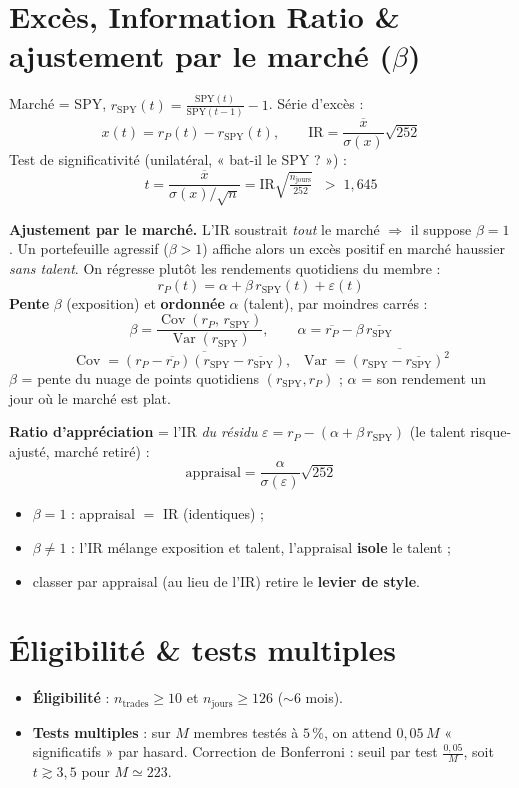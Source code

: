 \documentclass[10pt,a4paper,twocolumn]{article}
\begin{document}
\section{Excès, Information Ratio \& ajustement par le marché (\texorpdfstring{$\beta$}{beta})}\label{sec:beta}
Marché = SPY, $r_{\text{SPY}}(t)=\tfrac{\text{SPY}(t)}{\text{SPY}(t-1)}-1$. Série d'excès :
$$x(t)=r_P(t)-r_{\text{SPY}}(t),\qquad
  \mathrm{IR}=\frac{\overline{x}}{\sigma(x)}\sqrt{252}$$
Test de significativité (unilatéral, « bat-il le SPY ? ») :
$$t=\frac{\overline{x}}{\sigma(x)/\sqrt{n}}=\mathrm{IR}\sqrt{\tfrac{n_{\text{jours}}}{252}}\;\;>\;1{,}645$$

\smallskip
\textbf{Ajustement par le marché.} L'IR soustrait \emph{tout} le marché $\Rightarrow$ il suppose $\beta=1$. Un portefeuille agressif
($\beta>1$) affiche alors un excès positif en marché haussier \emph{sans talent}. On régresse plutôt
les rendements quotidiens du membre :
$$r_P(t)=\alpha+\beta\,r_{\text{SPY}}(t)+\varepsilon(t)$$
\textbf{Pente} $\beta$ (exposition) et \textbf{ordonnée} $\alpha$ (talent), par moindres carrés :
$$\beta=\frac{\operatorname{Cov}(r_P,\,r_{\text{SPY}})}{\operatorname{Var}(r_{\text{SPY}})},\qquad
  \alpha=\overline{r_P}-\beta\,\overline{r_{\text{SPY}}}$$
$$\operatorname{Cov}=\overline{(r_P-\overline{r_P})(r_{\text{SPY}}-\overline{r_{\text{SPY}}})},\;\;
  \operatorname{Var}=\overline{(r_{\text{SPY}}-\overline{r_{\text{SPY}}})^2}$$
$\beta$ = pente du nuage de points quotidiens $(r_{\text{SPY}},r_P)$ ; $\alpha$ = son rendement un jour où
le marché est plat.

\textbf{Ratio d'appréciation} = l'IR \emph{du résidu} $\varepsilon=r_P-(\alpha+\beta\,r_{\text{SPY}})$
(le talent risque-ajusté, marché retiré) :
$$\text{appraisal}=\frac{\alpha}{\sigma(\varepsilon)}\sqrt{252}$$
\begin{itemize}
  \item $\beta=1$ : appraisal $=$ IR (identiques) ;
  \item $\beta\neq1$ : l'IR mélange exposition et talent, l'appraisal \textbf{isole} le talent ;
  \item classer par appraisal (au lieu de l'IR) retire le \textbf{levier de style}.
\end{itemize}

\section{Éligibilité \& tests multiples}
\begin{itemize}
  \item \textbf{Éligibilité} : $n_{\text{trades}}\ge 10$ et $n_{\text{jours}}\ge 126$ ($\sim$6 mois).
  \item \textbf{Tests multiples} : sur $M$ membres testés à $5\,\%$, on attend $0{,}05\,M$ « significatifs »
        par hasard. Correction de Bonferroni : seuil par test $\tfrac{0{,}05}{M}$, soit
        $t \gtrsim 3{,}5$ pour $M\simeq 223$.
\end{itemize}
\end{document}
